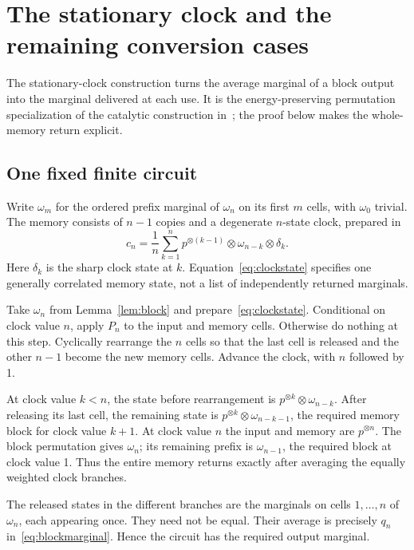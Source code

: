 \section{The stationary clock and the remaining conversion cases}\label{app:clock}
The stationary-clock construction turns the average marginal of a block output into the marginal delivered at each use. It is the energy-preserving permutation specialization of the catalytic construction in~\cite{wilming21,wilming22}; the proof below makes the whole-memory return explicit.

\subsection{One fixed finite circuit}
Write $\omega_m$ for the ordered prefix marginal of $\omega_n$ on its first $m$ cells, with $\omega_0$ trivial. The memory consists of $n-1$ copies and a degenerate $n$-state clock, prepared in
\begin{equation}
 c_n=\frac1n\sum_{k=1}^n p^{\otimes(k-1)}\otimes\omega_{n-k}\otimes\delta_k. \label{eq:clockstate}
\end{equation}
Here $\delta_k$ is the sharp clock state at $k$. Equation~\eqref{eq:clockstate} specifies one generally correlated memory state, not a list of independently returned marginals.

Take $\omega_n$ from Lemma~\ref{lem:block} and prepare~\eqref{eq:clockstate}. Conditional on clock value $n$, apply $P_n$ to the input and memory cells. Otherwise do nothing at this step. Cyclically rearrange the $n$ cells so that the last cell is released and the other $n-1$ become the new memory cells. Advance the clock, with $n$ followed by 1.

At clock value $k<n$, the state before rearrangement is $p^{\otimes k}\otimes\omega_{n-k}$. After releasing its last cell, the remaining state is $p^{\otimes k}\otimes\omega_{n-k-1}$, the required memory block for clock value $k+1$. At clock value $n$ the input and memory are $p^{\otimes n}$. The block permutation gives $\omega_n$; its remaining prefix is $\omega_{n-1}$, the required block at clock value 1. Thus the entire memory returns exactly after averaging the equally weighted clock branches.

The released states in the different branches are the marginals on cells $1,\ldots,n$ of $\omega_n$, each appearing once. They need not be equal. Their average is precisely $q_n$ in~\eqref{eq:blockmarginal}. Hence the circuit has the required output marginal.

